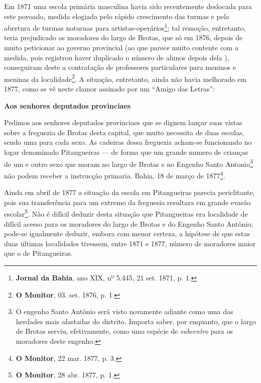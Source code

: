 Em 1871 uma escola primária masculina havia sido recentemente deslocada para este povoado, medida elogiada pelo rápido crescimento das turmas e pela abertura de turmas noturnas para artistas-operários\footnote{\textbf{Jornal da Bahia}, ano XIX, nº 5.445, 21 set. 1871, p. 1.}; tal remoção, entretanto, teria prejudicado os moradores do largo de Brotas, que só em 1876, depois de muito peticionar ao governo provincial (ao que parece muito contente com a medida, pois registrou haver duplicado o número de alunos depois dela \cite[relat.~instrução~pública,~p.~25]{bahia_1872}), conseguiram deste a contratação de professores particulares para meninos e meninas da localidade\footnote{\textbf{O Monitor}, 03. set. 1876, p. 1.}. A situação, entretanto, ainda não havia melhorado em 1877, como se vê neste clamor assinado por um ``Amigo das Letras'':

\begin{citacao}
\textbf{Aos senhores deputados provinciaes}

Pedimos aos senhores deputados provinciaes que se dignem lançar suas vistas sobre a freguezia de Brotas desta capital, que muito necessita de duas escolas, sendo uma para cada sexo. As cadeiras dessa freguezia acham-se funcionando no logar denominado Pitangueiras --- de forma que um grande numero de crianças de um e outro sexo que moram no largo de Brotas e no Engenho Santo Antonio\footnote{O engenho Santo Antônio será visto novamente adiante como uma das herdades mais afastadas do distrito. Importa saber, por enquanto, que o largo de Brotas serviu, efetivamente, como uma espécie de \textit{subcentro} para os moradores deste engenho.} não podem receber a instrucção primaria.
Bahia, 18 de março de 1877\footnote{\textbf{O Monitor}, 22 mar. 1877, p. 3.}.
\end{citacao}

Ainda em abril de 1877 a situação da escola em Pitangueiras parecia periclitante, pois sua transferência para um extremo da freguesia resultara em grande evasão escolar\footnote{\textbf{O Monitor}, 28 abr. 1877, p. 1.}. Não é difícil deduzir desta situação que Pitangueiras era localidade de difícil acesso para os moradores do largo de Brotas e do Engenho Santo Antônio; pode-se igualmente deduzir, embora com menor certeza, a hipótese de que estas duas últimas localidades tivessem, entre 1871 e 1877, número de moradores maior que o de Pitangueiras. 

